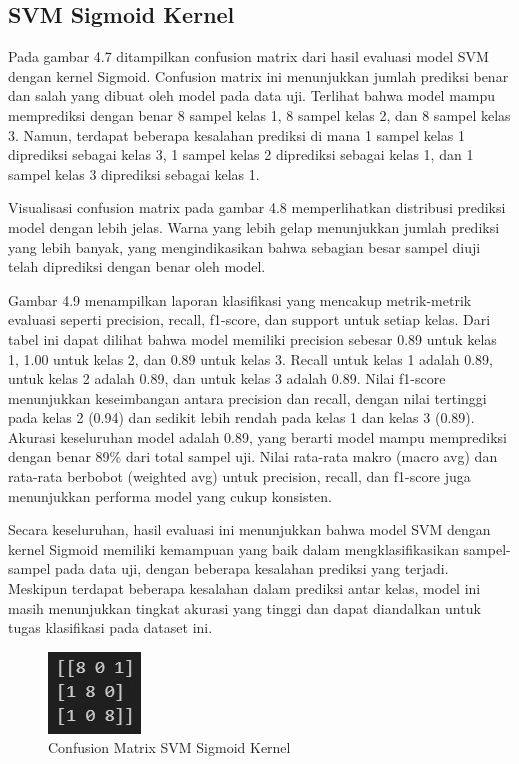 \subsection{SVM Sigmoid Kernel}
\label{sec:evalSigmoidKernel}

Pada gambar 4.7 ditampilkan confusion matrix dari hasil evaluasi model SVM dengan kernel Sigmoid. Confusion matrix ini menunjukkan jumlah prediksi benar dan salah yang dibuat oleh model pada data uji. Terlihat bahwa model mampu memprediksi dengan benar 8 sampel kelas 1, 8 sampel kelas 2, dan 8 sampel kelas 3. Namun, terdapat beberapa kesalahan prediksi di mana 1 sampel kelas 1 diprediksi sebagai kelas 3, 1 sampel kelas 2 diprediksi sebagai kelas 1, dan 1 sampel kelas 3 diprediksi sebagai kelas 1.

Visualisasi confusion matrix pada gambar 4.8 memperlihatkan distribusi prediksi model dengan lebih jelas. Warna yang lebih gelap menunjukkan jumlah prediksi yang lebih banyak, yang mengindikasikan bahwa sebagian besar sampel diuji telah diprediksi dengan benar oleh model.

Gambar 4.9 menampilkan laporan klasifikasi yang mencakup metrik-metrik evaluasi seperti precision, recall, f1-score, dan support untuk setiap kelas. Dari tabel ini dapat dilihat bahwa model memiliki precision sebesar 0.89 untuk kelas 1, 1.00 untuk kelas 2, dan 0.89 untuk kelas 3. Recall untuk kelas 1 adalah 0.89, untuk kelas 2 adalah 0.89, dan untuk kelas 3 adalah 0.89. Nilai f1-score menunjukkan keseimbangan antara precision dan recall, dengan nilai tertinggi pada kelas 2 (0.94) dan sedikit lebih rendah pada kelas 1 dan kelas 3 (0.89). Akurasi keseluruhan model adalah 0.89, yang berarti model mampu memprediksi dengan benar 89\% dari total sampel uji. Nilai rata-rata makro (macro avg) dan rata-rata berbobot (weighted avg) untuk precision, recall, dan f1-score juga menunjukkan performa model yang cukup konsisten.

Secara keseluruhan, hasil evaluasi ini menunjukkan bahwa model SVM dengan kernel Sigmoid memiliki kemampuan yang baik dalam mengklasifikasikan sampel-sampel pada data uji, dengan beberapa kesalahan prediksi yang terjadi. Meskipun terdapat beberapa kesalahan dalam prediksi antar kelas, model ini masih menunjukkan tingkat akurasi yang tinggi dan dapat diandalkan untuk tugas klasifikasi pada dataset ini.

\begin{figure} [H] \centering
  \includegraphics[scale=1]{gambar/cfsigmoid.jpg}
  \caption{Confusion Matrix SVM Sigmoid Kernel}
  \label{fig:evalcfsigmoidkernel}
\end{figure}

